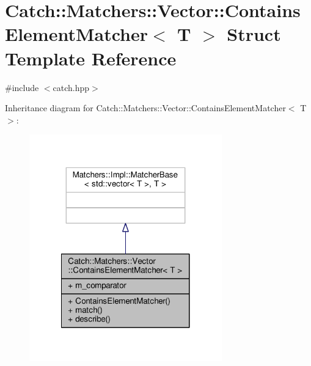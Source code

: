 \hypertarget{struct_catch_1_1_matchers_1_1_vector_1_1_contains_element_matcher}{\section{Catch\-:\-:Matchers\-:\-:Vector\-:\-:Contains\-Element\-Matcher$<$ T $>$ Struct Template Reference}
\label{struct_catch_1_1_matchers_1_1_vector_1_1_contains_element_matcher}
}


{\ttfamily \#include $<$catch.\-hpp$>$}



Inheritance diagram for Catch\-:\-:Matchers\-:\-:Vector\-:\-:Contains\-Element\-Matcher$<$ T $>$\-:
\nopagebreak
\begin{figure}[H]
\begin{center}
\leavevmode
\includegraphics[width=236pt]{struct_catch_1_1_matchers_1_1_vector_1_1_contains_element_matcher__inherit__graph}
\end{center}
\end{figure}


